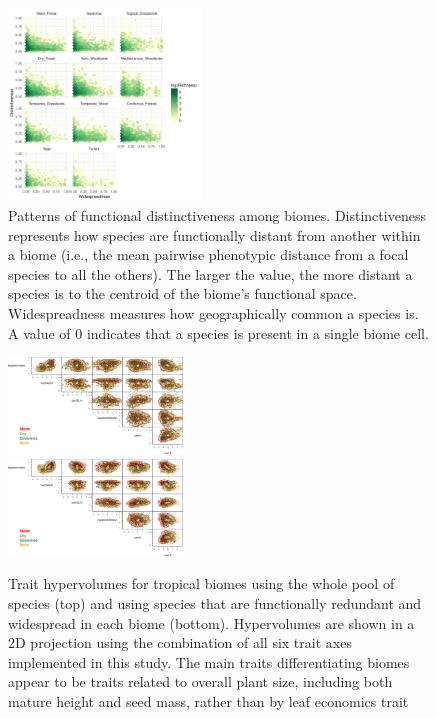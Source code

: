 \documentclass[final]{beamer}
\newlength{\twocolwid}
\begin{document}
\begin{frame}[t]
\begin{columns}[t]
\begin{column}{\twocolwid}
\begin{multicols}{2}{}
\begin{figure}[h]
	\centering
	\includegraphics[width=0.456\textwidth]{./figures/All_biomes_heatmap_logTraits.pdf}
	\caption{ \footnotesize Patterns of functional distinctiveness among biomes. Distinctiveness represents how species are functionally distant from another within a biome (i.e., the mean pairwise phenotypic distance from a focal species to all the others). The larger the value, the more distant a species is to the centroid of the biome's functional space. Widespreadness measures how geographically common a species is. A value of 0 indicates that a species is present in a single biome cell.}
	\label{fig:distinct_common}
\end{figure}


\begin{figure}[h]
	\centering
	\includegraphics[width=0.412\textwidth]{./figures/Total_Moist_Dry_Savanna_Xeric.png}\\
	\includegraphics[width=0.412\textwidth]{./figures/Redun_Moist_Dry_Savanna_Xeric.png}
	\caption{ \footnotesize Trait hypervolumes for tropical biomes using the whole pool of species (top) and using species that are functionally redundant and widespread in each biome (bottom).  Hypervolumes are shown in a 2D projection using the combination of all six trait axes implemented in this study. The main traits differentiating biomes appear to be traits related to overall plant size, including both mature height and seed mass, rather than by leaf economics trait}
	\label{fig:hypervolumes2}
\end{figure}



\end{multicols}
\end{column}
\end{columns}
\end{frame}
\end{document}
